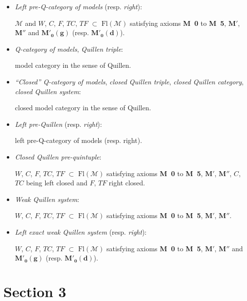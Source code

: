 \documentclass[11pt]{article}
\newcommand{\Fl}{\mathrm{Fl}}
\newcommand{\Mo}{\mathcal{M}}
\newcommand{\Mzg}{$\mathbf{M}'_{\mathbf{0}}\mathbf{(g)}$}
\newcommand{\Mzd}{$\mathbf{M}'_{\mathbf{0}}\mathbf{(d)}$}
\begin{document}
\begin{itemize}
\item[\textbullet] \textit{Left pre-Q-category of models} (resp. \textit{right}):

$\Mo$ and $W$, $C$, $F$, $TC$, $TF$ $\subset$ $\Fl(\Mo)$ satisfying axioms \textbf{M~0} to \textbf{M~5}, $\mathbf{M}'$, $\mathbf{M}''$ and \Mzg{} (resp. \Mzd).

\item[\textbullet] \textit{Q-category of models}, \textit{Quillen triple}:

model category in the sense of Quillen.

\item[\textbullet] \textit{``Closed'' Q-category of models}, \textit{closed Quillen triple}, \textit{closed Quillen category}, \textit{closed Quillen system}:

closed model category in the sense of Quillen.

\item[\textbullet] \textit{Left pre-Quillen} (resp. \textit{right}):

left pre-Q-category of models (resp. right).

\item[\textbullet] \textit{Closed Quillen pre-quintuple}:

$W$, $C$, $F$, $TC$, $TF$ $\subset$ $\Fl(\Mo)$ satisfying axioms \textbf{M~0} to \textbf{M~5}, $\mathbf{M}'$, $\mathbf{M}''$, $C$, $TC$ being left closed and $F$, $TF$ right closed.

\item[\textbullet] \textit{Weak Quillen system}:

$W$, $C$, $F$, $TC$, $TF$ $\subset$ $\Fl(\Mo)$ satisfying axioms \textbf{M~0} to \textbf{M~5}, $\mathbf{M}'$, $\mathbf{M}''$.

\item[\textbullet] \textit{Left exact weak Quillen system} (resp. \textit{right}):

$W$, $C$, $F$, $TC$, $TF$ $\subset$ $\Fl(\Mo)$ satisfying axioms \textbf{M~0} to \textbf{M~5}, $\mathbf{M}'$, $\mathbf{M}''$ and \Mzg{} (resp. \Mzd).
\end{itemize}

\section*{Section 3}
\end{document}

